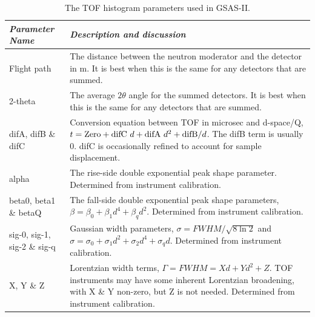 \begin{table}
\centering
\caption{The TOF histogram parameters used in GSAS-II.}
\label{tab:TOFprofile}
\begin{tabular}{| l | p{} |}
\hline
\textit{Parameter Name} & \textit{Description and discussion} \\
\hline
Flight path & The distance between the neutron moderator and the detector in m. 
It is best when this is the same for any detectors that are summed.\\
\hline
2-theta & The average $2\theta$ angle for the summed detectors. 
It is best when this is the same for any detectors that are summed.\\
\hline
difA, difB \& difC & Conversion equation between TOF in microsec and d-space/Q, 
$t = {\rm Zero} + {\rm difC}\ d + {\rm difA}\ d^2 + {\rm difB}/d$.
The difB term is usually 0. difC is occasionally refined to account for sample 
displacement.\\
\hline
alpha & The rise-side double exponential peak shape parameter. 
Determined from instrument calibration. \\
\hline
beta0, beta1 \& betaQ & The fall-side double exponential peak shape parameters, 
$\beta = \beta_0 + \beta_1 d^{4} + \beta_q d^{2}$. 
Determined from instrument calibration. \\
\hline
sig-0, sig-1, sig-2 \& sig-q & Gaussian width parameters, $\sigma=FWHM / \sqrt{8\ln{2}}$ and 
$\sigma = \sigma_0 + {\sigma_1}{d^{2}} + {\sigma_2}{d^{4}} + {\sigma_q}{d}$.
Determined from instrument calibration. \\
\hline
X, Y \& Z & Lorentzian width terms,
$\Gamma = FWHM ={X}{d}+{Y}{d^{2}}+Z$. TOF instruments may have some inherent 
Lorentzian broadening, with X \& Y non-zero, but Z is not needed. 
Determined from instrument calibration. \\
\hline
\end{tabular}
\end{table}

\clearpage

